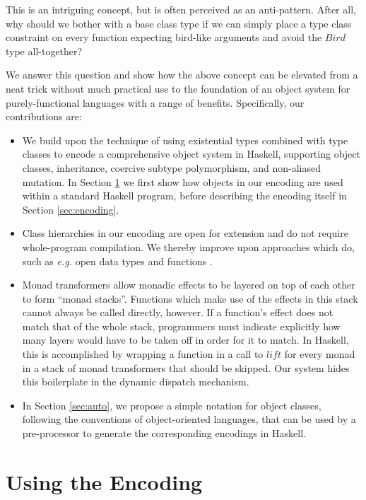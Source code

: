 \documentclass[runningheads,a4paper]{llncs}
\begin{document}
This is an intriguing concept, but is often perceived as an anti-pattern. After all, why should we bother with a base class type if we can simply place a type class constraint on every function expecting bird-like arguments and avoid the $\mathit{Bird}$ type all-together?

We answer this question and show how the above concept can be elevated from a neat trick without much practical use to the foundation of an object system for purely-functional languages with a range of benefits. Specifically, our contributions are:
\begin{itemize}
\item We build upon the technique of using existential types combined with type classes to encode a comprehensive object system in Haskell, supporting object classes, inheritance, coercive subtype polymorphism, and non-aliased mutation. In Section \ref{sec:usage} we first show how objects in our encoding are used within a standard Haskell program, before describing the encoding itself in Section \ref{sec:encoding}.
\item Class hierarchies in our encoding are open for extension and do not require whole-program compilation. We thereby improve upon approaches which do, such as \emph{e.g.} open data types and functions \cite{loh2006open}.
\item Monad transformers \cite{moggi1989abstract,jones1995transformers} allow monadic effects to be layered on top of each other to form ``monad stacks''. Functions which make use of the effects in this stack cannot always be called directly, however. If a function's effect does not match that of the whole stack, programmers must indicate explicitly how many layers would have to be taken off in order for it to match. In Haskell, this is accomplished by wrapping a function in a call to $\mathit{lift}$ for every monad in a stack of monad transformers that should be skipped. Our system hides this boilerplate in the dynamic dispatch mechanism. 
\item In Section \ref{sec:auto}, we propose a simple notation for object classes, following the conventions of object-oriented languages, that can be used by a pre-processor to generate the corresponding encodings in Haskell.
\end{itemize}

\section{Using the Encoding}
\label{sec:usage}
\end{document}

